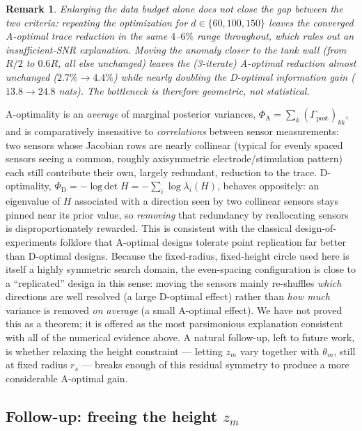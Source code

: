 \documentclass[11pt,a4paper]{article}
\newtheorem{remark}{Remark}
\newcommand{\logdet}{\operatorname{log\,det}}
\newcommand{\Gpost}{\Gamma_{\mathrm{post}}}
\begin{document}
\begin{remark}
Enlarging the data budget alone does not close the gap between the two criteria: repeating the
optimization for $d \in \{60, 100, 150\}$ leaves the converged A-optimal trace reduction in the
same $4$--$6\%$ range throughout, which rules out an insufficient-SNR explanation. Moving the
anomaly closer to the tank wall (from $R/2$ to $0.6R$, all else unchanged) leaves the (3-iterate)
A-optimal reduction almost unchanged ($2.7\% \to 4.4\%$) while nearly doubling the D-optimal
information gain ($13.8 \to 24.8$ nats). The bottleneck is therefore geometric, not statistical.
\end{remark}
A-optimality is an \emph{average} of marginal posterior variances,
$\Phi_{\mathrm{A}} = \sum_k (\Gpost)_{kk}$, and is comparatively insensitive to
\emph{correlations} between sensor measurements: two sensors whose Jacobian rows are nearly
collinear (typical for evenly spaced sensors seeing a common, roughly axisymmetric
electrode/stimulation pattern) each still contribute their own, largely redundant, reduction to
the trace. D-optimality, $\Phi_{\mathrm{D}} = -\logdet H = -\sum_i \log \lambda_i(H)$, behaves
oppositely: an eigenvalue of $H$ associated with a direction seen by two collinear sensors stays
pinned near its prior value, so \emph{removing} that redundancy by reallocating sensors is
disproportionately rewarded. This is consistent with the classical design-of-experiments folklore
that A-optimal designs tolerate point replication far better than D-optimal designs. Because the
fixed-radius, fixed-height circle used here is itself a highly symmetric search domain, the
even-spacing configuration is close to a ``replicated'' design in this sense: moving the sensors
mainly re-shuffles \emph{which} directions are well resolved (a large D-optimal effect) rather
than \emph{how much} variance is removed \emph{on average} (a small A-optimal effect). We have not
proved this as a theorem; it is offered as the most parsimonious explanation consistent with all
of the numerical evidence above. A natural follow-up, left to future work, is whether relaxing the
height constraint --- letting $z_m$ vary together with $\theta_m$, still at fixed radius $r_s$ ---
breaks enough of this residual symmetry to produce a more considerable A-optimal gain.

\subsection{Follow-up: freeing the height $z_m$}
\label{sec:case-study-thetaz}
\end{document}
